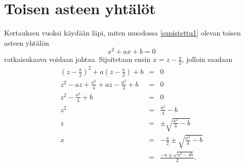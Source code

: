 \documentclass[a4paper,12pt,twoside]{article}
\begin{document}
\section{Toisen asteen yhtälöt}
Kertauksen vuoksi käydään läpi, miten muodossa \ref{supistettu1} olevan toisen asteen yhtälön
$$
x^2+ax+b=0
$$
ratkaisukaava voidaan johtaa. Sijoitetaan ensin $x=z-\frac{a}{2}$, jolloin saadaan
\begin{eqnarray*}
  \left(z-\frac{a}{2}\right)^2+a\left(z-\frac{a}{2}\right)+b & = & 0 \\
  z^2-az+\frac{a^2}{4}+az-\frac{a^2}{2}+b & = & 0 \\
  z^2-\frac{a^2}{4}+b & = & 0 \\
  z^2 & = & \frac{a^2}{4}-b \\
  z & = & \pm\sqrt{\frac{a^2}{4}-b} \\
  x & = & -\frac{a}{2}\pm\sqrt{\frac{a^2}{4}-b} \\
  & = & \frac{-a\pm\sqrt{a^2-4b}}{2}.
\end{eqnarray*}
\end{document}
